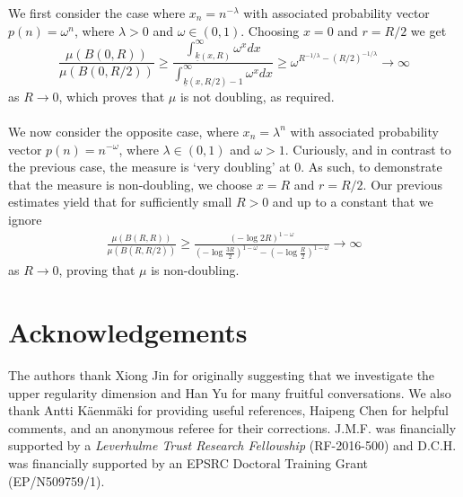 \documentclass[12pt]{amsart}
\numberwithin{equation}{section}
\renewcommand{\geq}{\geqslant}
\begin{document}
We first consider the case where  $x_n=n^{-\lambda}$ with associated probability vector $p(n)=\omega^n$, where $\lambda>0$ and $\omega\in(0,1)$.  Choosing  $x=0$ and $r=R/2$ we get
\[
 \frac{\mu(B(0,R))}{\mu(B(0,R/2))}   \geq  \frac{\int_{\underline{k}(x,R)}^\infty \omega^x dx}{\int_{\underline{k}(x,R/2)-1}^\infty \omega^x dx} \geq   \omega^{R^{-1/\lambda}-(R/2)^{-1/\lambda}} \to \infty
\]
as $R \to 0$, which proves that $\mu$ is not doubling, as required.
\\ \\
We now consider the opposite case, where $x_n=\lambda^{n}$ with associated probability vector $p(n)=n^{-\omega}$, where $\lambda\in (0,1)$ and $\omega > 1$. Curiously, and in contrast to the previous case,  the measure is `very doubling' at 0. As such, to demonstrate that the measure is non-doubling, we choose $x=R$ and $r=R/2$.  Our previous estimates yield that for sufficiently small $R>0$ and up to a constant that we ignore
\begin{eqnarray*}
\frac{\mu(B(R,R))}{\mu(B(R,R/2))}   \geq  \frac{(-\log 2R)^{1-\omega}}{(-\log \frac{3R}{2})^{1-\omega} - (-\log\frac{R}{2} )^{1-\omega}}   \to \infty
\end{eqnarray*}
as $R \to 0$, proving that  $\mu$ is non-doubling.





\section*{Acknowledgements}


The authors thank Xiong Jin for originally suggesting that we investigate the upper regularity dimension and Han Yu for many fruitful conversations. We also thank Antti K\"aenm\"aki for providing useful references, Haipeng Chen for helpful comments, and an anonymous referee for their corrections. J.M.F. was financially supported by a \emph{Leverhulme Trust Research Fellowship} (RF-2016-500) and D.C.H. was financially supported by an EPSRC Doctoral Training Grant (EP/N509759/1).
\end{document}
